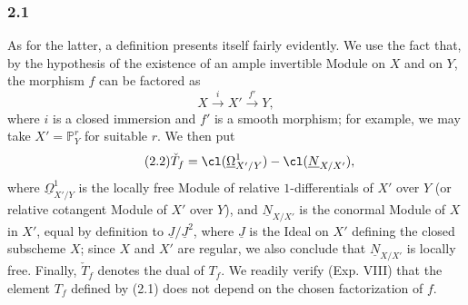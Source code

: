 \subsubsection*{2.1}
As for the latter, a definition presents itself fairly evidently. We use the fact that, by the hypothesis of the existence of an ample invertible Module on $X$ and on $Y$, the morphism $f$ can be factored as
\begin{equation}\tag{2.1}
X\xrightarrow{i}X'\xrightarrow{f'}Y,
\end{equation}
where $i$ is a closed immersion and $f'$ is a smooth morphism; for example, we may take $X'=\mathbb P^r_Y$ for suitable $r$. We then put
\begin{equation}\tag{2.2}
\check T_f=\cl({\underline\Omega}^1_{X'/Y})-\cl({\underline N}_{X/X'}),
\end{equation}
where ${\underline\Omega}^1_{X'/Y}$ is the locally free Module of relative $1$-differentials of $X'$ over $Y$ (or relative cotangent Module of $X'$ over $Y$), and ${\underline N}_{X/X'}$ is the conormal Module of $X$ in $X'$, equal by definition to ${\underline J}/{\underline J}^2$, where ${\underline J}$ is the Ideal on $X'$ defining the closed subscheme $X$; since $X$ and $X'$ are regular, we also conclude that ${\underline N}_{X/X'}$ is locally free. Finally, $\check T_f$ denotes the dual of $T_f$. We readily verify (Exp. VIII) that the element $T_f$ defined by (2.1) does not depend on the chosen factorization of $f$.

